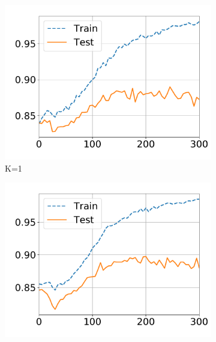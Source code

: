\begin{figure}[!t]
  \captionsetup[subfigure]{justification=centering}
  \centering
  \begin{subfigure}{.31\textwidth}
    \centering
    \includegraphics[width=1\linewidth]{images/supply/train_curves/satimage_1.pdf}
    \vspace{-0.8cm}
    \caption{K=1}
  \end{subfigure}
  \vspace{-2pt}
  \begin{subfigure}{.31\textwidth}
    \centering
    \includegraphics[width=1\linewidth]{images/supply/train_curves/satimage_2.pdf}
    \vspace{-0.8cm}

\end{subfigure}
\end{figure}
